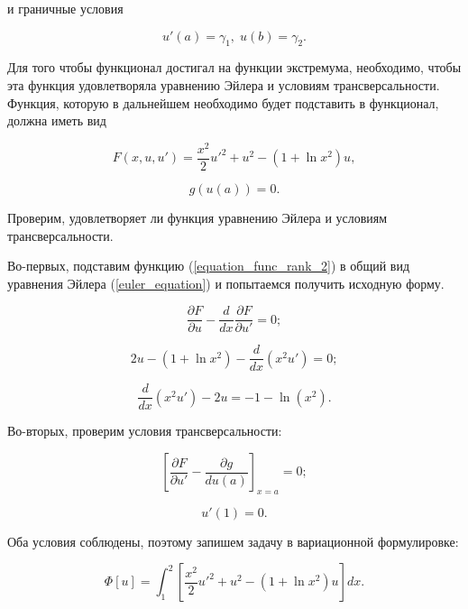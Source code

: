 \documentclass{article}
\begin{document}
\noindent и граничные условия

\begin{displaymath}
	u'(a) = \gamma_{1}, \; u(b) = \gamma_{2}.
\end{displaymath}

Для того чтобы функционал достигал на функции экстремума, необходимо, чтобы эта функция удовлетворяла уравнению Эйлера и условиям трансверсальности. Функция, которую в дальнейшем необходимо будет подставить в функционал, должна иметь вид

\begin{equation}\label{equation_func_rank_2}
	F(x, u, u') = \frac{x^2}{2}u'^2 + u^2 - (1+\ln{x^2})u,
\end{equation}

\begin{displaymath}
	g(u(a)) = 0.
\end{displaymath}

\noindent Проверим, удовлетворяет ли функция уравнению Эйлера и условиям трансверсальности. 

Во-первых, подставим функцию (\ref{equation_func_rank_2}) в общий вид уравнения Эйлера (\ref{euler_equation}) и попытаемся получить исходную форму.

\begin{displaymath}
	\frac{\partial F}{\partial u} - \frac{d}{dx}\frac{\partial F}{\partial u'} = 0;
\end{displaymath}

\begin{displaymath}
	2u - (1 + \ln{x^2}) - \frac{d}{dx}(x^2 u') = 0;
\end{displaymath}

\begin{displaymath}
	\frac{d}{dx}(x^2 u') - 2u = -1 - \ln(x^2).
\end{displaymath}

\noindent Во-вторых, проверим условия трансверсальности:

\begin{displaymath}
	\left[ \frac{\partial F}{\partial u'} - \frac{\partial g}{du(a)} \right]_{x=a} = 0;
\end{displaymath}

\begin{displaymath}
	u'(1) = 0.
\end{displaymath}

\noindent Оба условия соблюдены, поэтому запишем задачу в вариационной формулировке:

\begin{equation}\label{equation_functional_rank_2}
	\Phi[u] = \int_{1}^{2} \left[ \frac{x^2}{2}u'^2 + u^2 - (1 + \ln{x^2})u \right] dx.
\end{equation}
\end{document}
